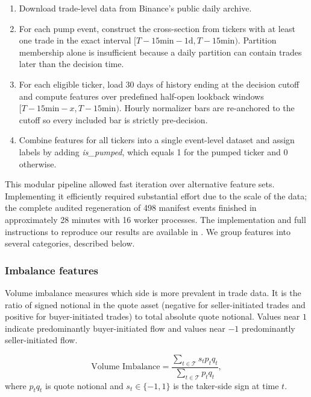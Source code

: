 \documentclass{ieeeaccess}
\begin{document}
\begin{enumerate}
    \item Download trade-level data from Binance's public daily archive.
    \item For each pump event, construct the cross-section from tickers with at least one trade in the exact interval $[T-15\text{min}-1\text{d},T-15\text{min})$. Partition membership alone is insufficient because a daily partition can contain trades later than the decision time.
    \item For each eligible ticker, load 30 days of history ending at the decision cutoff and compute features over predefined half-open lookback windows $[T-15\text{min}-x,T-15\text{min})$. Hourly normalizer bars are re-anchored to the cutoff so every included bar is strictly pre-decision.
    \item Combine features for all tickers into a single event-level dataset and assign labels by adding \textit{is\_pumped}, which equals 1 for the pumped ticker and 0 otherwise.
\end{enumerate}

This modular pipeline allowed fast iteration over alternative feature sets. Implementing it efficiently required substantial effort due to the scale of the data; the complete audited regeneration of 498 manifest events finished in approximately 28 minutes with 16 worker processes. The implementation and full instructions to reproduce our results are available in \cite{code_github}. We group features into several categories, described below.

\subsubsection{Imbalance features}

Volume imbalance measures which side is more prevalent in trade data. It is the ratio of signed notional in the quote asset (negative for seller-initiated trades and positive for buyer-initiated trades) to total absolute quote notional. Values near $1$ indicate predominantly buyer-initiated flow and values near $-1$ predominantly seller-initiated flow.

\begin{equation}
    \text{Volume Imbalance} = \frac{\sum_{t \in \mathcal{T}}s_t p_t q_t}{\sum_{t \in \mathcal{T}}p_t q_t},
    \label{eq:volume_imbalance}
\end{equation}
where $p_tq_t$ is quote notional and $s_t\in\{-1,1\}$ is the taker-side sign at time $t$.
\end{document}

